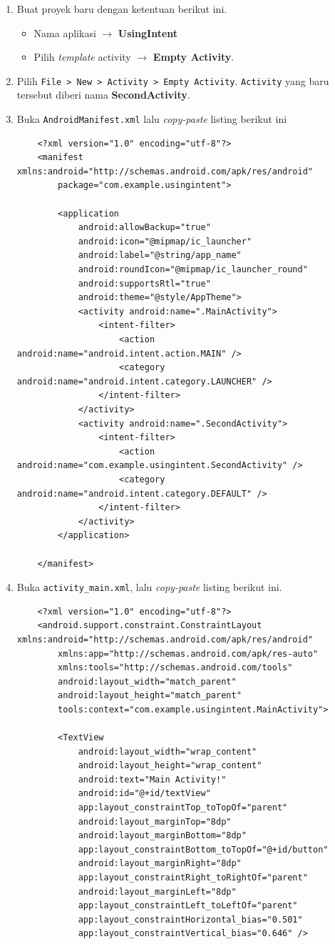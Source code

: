 \documentclass{scrartcl}
\begin{document}
\begin{enumerate}
	\item Buat proyek baru dengan ketentuan berikut ini.
	\begin{itemize}
		\item Nama aplikasi $\rightarrow$ \textbf{UsingIntent}
		\item Pilih \textit{template} activity $\rightarrow$ \textbf{Empty Activity}.
	\end{itemize}
	\item Pilih \texttt{File > New > Activity > Empty Activity}. \texttt{Activity} yang baru tersebut diberi nama \textbf{SecondActivity}.
	\item Buka \texttt{AndroidManifest.xml} lalu \textit{copy-paste} listing berikut ini
	\begin{verbatim}
	<?xml version="1.0" encoding="utf-8"?>
	<manifest xmlns:android="http://schemas.android.com/apk/res/android"
		package="com.example.usingintent">
		
		<application
			android:allowBackup="true"
			android:icon="@mipmap/ic_launcher"
			android:label="@string/app_name"
			android:roundIcon="@mipmap/ic_launcher_round"
			android:supportsRtl="true"
			android:theme="@style/AppTheme">
			<activity android:name=".MainActivity">
				<intent-filter>
					<action android:name="android.intent.action.MAIN" />
					<category android:name="android.intent.category.LAUNCHER" />
				</intent-filter>
			</activity>
			<activity android:name=".SecondActivity">
				<intent-filter>
					<action android:name="com.example.usingintent.SecondActivity" />
					<category android:name="android.intent.category.DEFAULT" />
				</intent-filter>
			</activity>
		</application>
	
	</manifest>
	\end{verbatim}
	\item Buka \texttt{activity\_main.xml}, lalu \textit{copy-paste} listing berikut ini.
	\begin{verbatim}
	<?xml version="1.0" encoding="utf-8"?>
	<android.support.constraint.ConstraintLayout xmlns:android="http://schemas.android.com/apk/res/android"
		xmlns:app="http://schemas.android.com/apk/res-auto"
		xmlns:tools="http://schemas.android.com/tools"
		android:layout_width="match_parent"
		android:layout_height="match_parent"
		tools:context="com.example.usingintent.MainActivity">
		
		<TextView
			android:layout_width="wrap_content"
			android:layout_height="wrap_content"
			android:text="Main Activity!"
			android:id="@+id/textView"
			app:layout_constraintTop_toTopOf="parent"
			android:layout_marginTop="8dp"
			android:layout_marginBottom="8dp"
			app:layout_constraintBottom_toTopOf="@+id/button"
			android:layout_marginRight="8dp"
			app:layout_constraintRight_toRightOf="parent"
			android:layout_marginLeft="8dp"
			app:layout_constraintLeft_toLeftOf="parent"
			app:layout_constraintHorizontal_bias="0.501"
			app:layout_constraintVertical_bias="0.646" />
		

\end{verbatim}
\end{enumerate}
\end{document}
